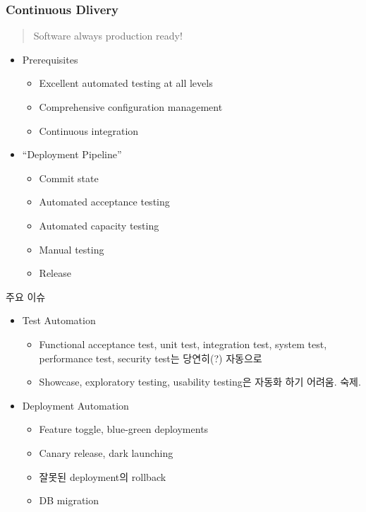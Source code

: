 \begin{frame}[allowframebreaks]
\frametitle{Continuous Dlivery}

\begin{quote}
Software always production ready!
\end{quote}

\begin{itemize}
  \item Prerequisites 
  \begin{itemize}
  \item Excellent automated testing at all levels
  \item Comprehensive configuration management
  \item Continuous integration
  \end{itemize}

  \item ``Deployment Pipeline''
  \begin{itemize}
  \item Commit state
  \item Automated acceptance testing
  \item Automated capacity testing
  \item Manual testing
  \item Release
  \end{itemize}
\end{itemize}

\pagebreak

주요 이슈
 
\begin{itemize}
\item Test Automation
  \begin{itemize}
  \item Functional acceptance test, unit test, integration test,
    system test, performance test, security test는 당연히(?) 자동으로
  \item Showcase, exploratory testing, usability testing은 자동화 하기 어려움.
    숙제.
  \end{itemize}
\item Deployment Automation
  \begin{itemize}
  \item Feature toggle, blue-green deployments
  \item Canary release, dark launching
  \item 잘못된 deployment의 rollback
  \item DB migration %
  \end{itemize}
\end{itemize}

\end{frame}
